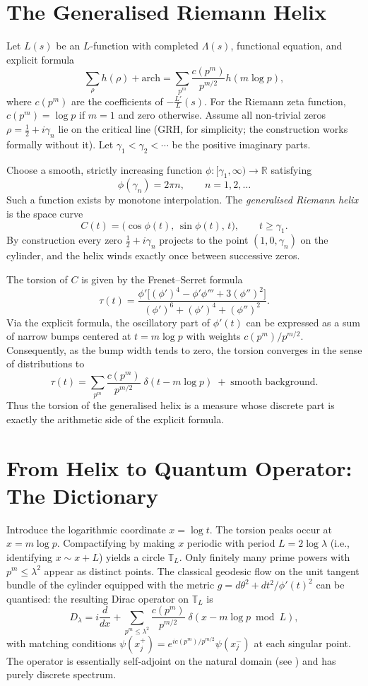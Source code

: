 \documentclass[12pt,a4paper]{article}
\newcommand{\R}{\mathbb{R}}
\newcommand{\T}{\mathbb{T}}
\begin{document}
\section{The Generalised Riemann Helix}
Let $L(s)$ be an $L$-function with completed $\Lambda(s)$, functional equation, and explicit formula
\[
\sum_{\rho} h(\rho) + \text{arch} = \sum_{p^m} \frac{c(p^m)}{p^{m/2}} h(m\log p),
\]
where $c(p^m)$ are the coefficients of $-\frac{L'}{L}(s)$.  For the Riemann zeta function, $c(p^m)=\log p$ if $m=1$ and zero otherwise.  Assume all non‑trivial zeros $\rho=\frac12+i\gamma_n$ lie on the critical line (GRH, for simplicity; the construction works formally without it).  Let $\gamma_1<\gamma_2<\cdots$ be the positive imaginary parts.

Choose a smooth, strictly increasing function $\phi:[\gamma_1,\infty)\to\R$ satisfying
\[
\phi(\gamma_n)=2\pi n,\qquad n=1,2,\dots
\]
Such a function exists by monotone interpolation.  The \emph{generalised Riemann helix} is the space curve
\[
C(t) = \bigl(\cos\phi(t),\,\sin\phi(t),\,t\bigr),\qquad t\ge\gamma_1.
\]
By construction every zero $\frac12+i\gamma_n$ projects to the point $(1,0,\gamma_n)$ on the cylinder, and the helix winds exactly once between successive zeros.

The torsion of $C$ is given by the Frenet--Serret formula
\[
\tau(t) = \frac{\phi'\bigl[(\phi')^4 - \phi'\phi''' + 3(\phi'')^2\bigr]}{(\phi')^6+(\phi')^4+(\phi'')^2}.
\tag{1}
\]
Via the explicit formula, the oscillatory part of $\phi'(t)$ can be expressed as a sum of narrow bumps centered at $t=m\log p$ with weights $c(p^m)/p^{m/2}$.  Consequently, as the bump width tends to zero, the torsion converges in the sense of distributions to
\[
\tau(t) = \sum_{p^m} \frac{c(p^m)}{p^{m/2}}\;\delta(t - m\log p) \;+\; \text{smooth background}.
\tag{2}
\]
Thus the torsion of the generalised helix is a measure whose discrete part is exactly the arithmetic side of the explicit formula.

\section{From Helix to Quantum Operator: The Dictionary}
Introduce the logarithmic coordinate $x = \log t$.  The torsion peaks occur at $x = m\log p$.  Compactifying by making $x$ periodic with period $L=2\log\lambda$ (i.e., identifying $x\sim x+L$) yields a circle $\T_L$.  Only finitely many prime powers with $p^m\le\lambda^2$ appear as distinct points.  The classical geodesic flow on the unit tangent bundle of the cylinder equipped with the metric $g = d\theta^2 + dt^2/\phi'(t)^2$ can be quantised: the resulting Dirac operator on $\T_L$ is
\[
D_\lambda = i\frac{d}{dx} + \sum_{p^m\le\lambda^2} \frac{c(p^m)}{p^{m/2}}\;\delta(x - m\log p \bmod L),
\tag{3}
\]
with matching conditions $\psi(x_j^+) = e^{i c(p^m)/p^{m/2}} \psi(x_j^-)$ at each singular point.  The operator is essentially self‑adjoint on the natural domain (see \cite{Albeverio1988}) and has purely discrete spectrum.
\end{document}
